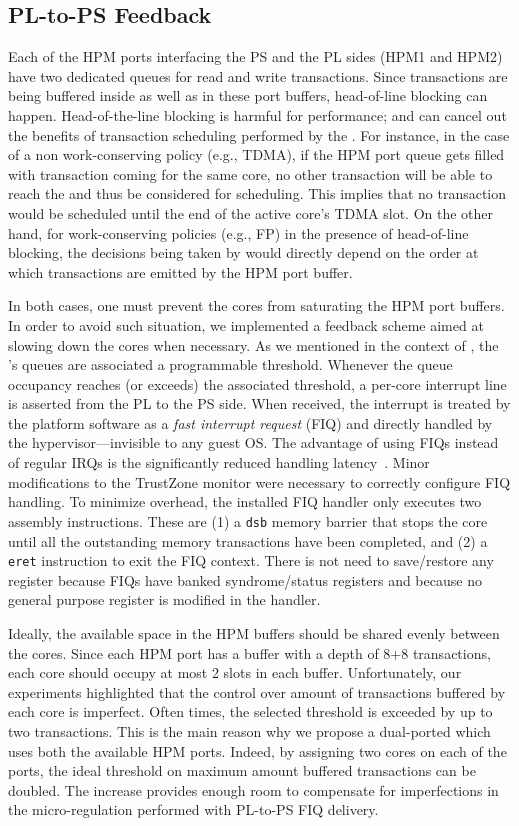 \subsection{PL-to-PS Feedback}
\label{sec:pl-to-ps-feedback}
Each of the HPM ports interfacing the PS and the PL sides (HPM1 and
HPM2) have two dedicated queues for read and write transactions. Since
transactions are being buffered inside \schim as well as in these port
buffers, head-of-line blocking can happen. Head-of-the-line blocking
is harmful for performance; and can cancel out the benefits of
transaction scheduling performed by the \schim. For instance, in the
case of a non work-conserving policy (e.g., TDMA), if the HPM port
queue gets filled with transaction coming for the same core, no other
transaction will be able to reach the \schim and thus be considered
for scheduling. This implies that no transaction would be scheduled
until the end of the active core's TDMA slot. On the other hand, for
work-conserving policies (e.g., FP) in the presence of head-of-line
blocking, the decisions being taken by \schim would directly depend on
the order at which transactions are emitted by the HPM port buffer.

In both cases, one must prevent the cores from saturating the HPM port
buffers. In order to avoid such situation, we implemented a feedback
scheme aimed at slowing down the cores when necessary. As we mentioned
in the context of , the \schim's
queues are associated a programmable threshold. Whenever the queue
occupancy reaches (or exceeds) the associated threshold, a per-core
interrupt line is asserted from the PL to the PS side. When received,
the interrupt is treated by the platform software as a \emph{fast
  interrupt request} (FIQ) and directly handled by the
hypervisor---invisible to any guest OS. The advantage of using FIQs
instead of regular IRQs is the significantly reduced handling
latency~\cite{fiq_results}. Minor modifications to the TrustZone
monitor were necessary to correctly configure FIQ handling. To
minimize overhead, the installed FIQ handler only executes two
assembly instructions. These are (1) a \texttt{dsb} memory barrier
that stops the core until all the outstanding memory transactions have
been completed, and (2) a \texttt{eret} instruction to exit the FIQ
context. There is not need to save/restore any register because FIQs
have banked syndrome/status registers and because no general purpose
register is modified in the handler.

Ideally, the available space in the HPM buffers should be shared
evenly between the cores. Since each HPM port has a buffer with a
depth of 8+8 transactions, each core should occupy at most 2 slots in
each buffer. Unfortunately, our experiments highlighted that the
control over amount of transactions buffered by each core is
imperfect. Often times, the selected threshold is exceeded by up to
two transactions. This is the main reason why we propose a dual-ported
\schim which uses both the available HPM ports. Indeed, by assigning
two cores on each of the ports, the ideal threshold on maximum amount
buffered transactions can be doubled. The increase provides enough
room to compensate for imperfections in the micro-regulation performed
with PL-to-PS FIQ delivery.

